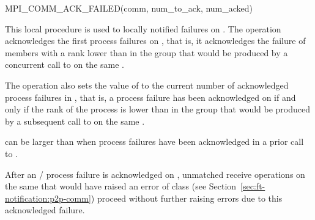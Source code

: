 \begin{funcdef}{MPI\_COMM\_ACK\_FAILED}{(\mbox{comm}, \mbox{num\_to\_ack}, \mbox{num\_acked})}
\end{funcdef}

\par
This local procedure is used to
locally notified failures on . The operation acknowledges the first 
process failures on , that is, it acknowledges the failure of members with a rank lower than
 in the group that would be produced by a concurrent call to 
on the same .

The operation also sets the value of  to the current number of acknowledged process
failures in , that is, a process failure has been acknowledged on  if and only if
the rank of the process is lower than  in the group that would be produced by a subsequent call to
 on the same .

 can be larger than  when process failures have been acknowledged in a prior call
to .

After an \MPI/ process failure is acknowledged on , unmatched  receive operations
on the same  that would have raised an error of class 
(see Section~\ref{sec:ft-notification:p2p-comm}) proceed without further
raising errors due to this acknowledged failure.

